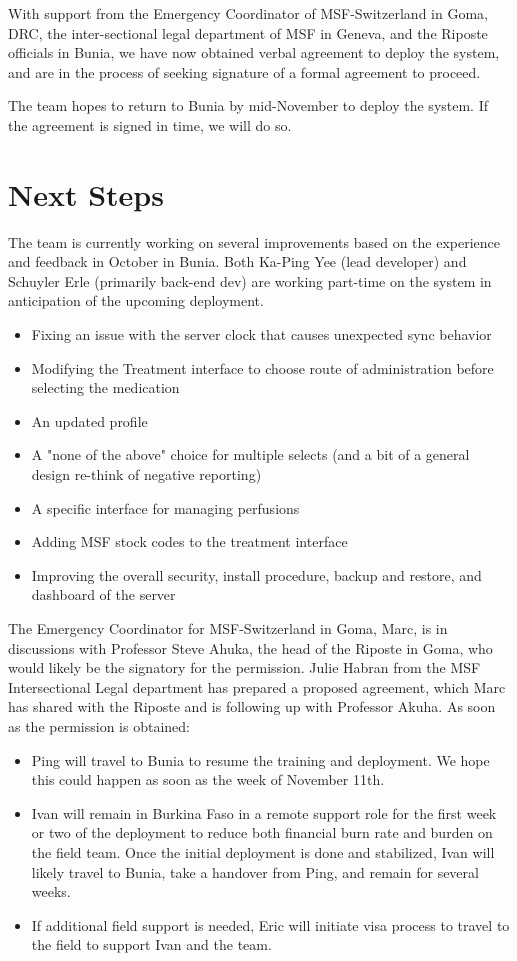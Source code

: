 \documentclass[a4paper,12pt,twoside]{article}
\begin{document}
With support from the Emergency Coordinator of MSF-Switzerland in Goma, DRC, the inter-sectional legal department of MSF in Geneva, and the Riposte officials in Bunia, we have now obtained verbal agreement to deploy the system, and are in the process of seeking signature of a formal agreement to proceed. 

The team hopes to return to Bunia by mid-November to deploy the system. If the agreement is signed in time, we will do so.

\section{Next Steps}
The team is currently working on several improvements based on the experience and feedback in October in Bunia. Both Ka-Ping Yee (lead developer) and Schuyler Erle (primarily back-end dev) are working part-time on the system in anticipation of the upcoming deployment. 
\begin{itemize}
    \item Fixing an issue with the server clock that causes unexpected sync behavior
    \item Modifying the Treatment interface to choose route of administration before selecting the medication
    \item An updated profile
    \item A "none of the above" choice for multiple selects (and a bit of a general design re-think of negative reporting)
    \item A specific interface for managing perfusions
    \item Adding MSF stock codes to the treatment interface
    \item Improving the overall security, install procedure, backup and restore, and dashboard of the server
\end{itemize}

The Emergency Coordinator for MSF-Switzerland in Goma, Marc, is in discussions with Professor Steve Ahuka, the head of the Riposte in Goma, who would likely be the signatory for the permission. Julie Habran from the MSF Intersectional Legal department has prepared a proposed agreement, which Marc has shared with the Riposte and is following up with Professor Akuha. As soon as the permission is obtained:

\begin{itemize}
    \item Ping will travel to Bunia to resume the training and deployment. We hope this could happen as soon as the week of November 11th.
    \item Ivan will remain in Burkina Faso in a remote support role for the first week or two of the deployment to reduce both financial burn rate and burden on the field team. Once the initial deployment is done and stabilized, Ivan will likely travel to Bunia, take a handover from Ping, and remain for several weeks.
    \item If additional field support is needed, Eric will initiate visa process to travel to the field to support Ivan and the team.
\end{itemize}
\end{document}
